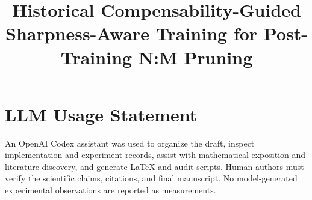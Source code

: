 \documentclass[10pt,a4paper]{article}
\title{Historical Compensability-Guided Sharpness-Aware Training for Post-Training N:M Pruning}
\author{}\date{}
\begin{document}
\maketitle







\label{main-end}
\clearpage
\appendix

\section*{LLM Usage Statement}
An OpenAI Codex assistant was used to organize the draft, inspect implementation and experiment records, assist with mathematical exposition and literature discovery, and generate LaTeX and audit scripts. Human authors must verify the scientific claims, citations, and final manuscript. No model-generated experimental observations are reported as measurements.


\end{document}
